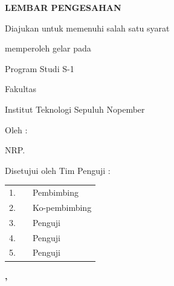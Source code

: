 \begin{center}
  \textbf{LEMBAR PENGESAHAN}\par
  \vspace{\baselineskip}
  \vspace{\baselineskip}
  \textbf{\MakeUppercase{\tatitle{}}}\par
  \vspace{\baselineskip}
  \textbf{\doctypename{}}\par
  Diajukan untuk memenuhi salah satu syarat\par
  memperoleh gelar \degree{} pada\par
  Program Studi S-1 \studyprogram{}\par
  Fakultas \faculty{}\par
  Institut Teknologi Sepuluh Nopember\par
  \vspace{\baselineskip}
  Oleh : \textbf{\MakeUppercase{\name{}}}\par
  NRP. \nrp{}\par
  \vspace{\baselineskip}
  Disetujui oleh Tim Penguji \doctypename{}:
\end{center}

\begingroup
\renewcommand{\arraystretch}{2.2}
\noindent
\begin{tabularx}{\textwidth}{@{}r X p{}@{}}
  1. & \advisor{}    & Pembimbing \\
  2. & \coadvisor{}  & Ko-pembimbing \\
  3. & \examinerone{} & Penguji \\
  4. & \examinertwo{} & Penguji \\
  5. & \examinerthree{} & Penguji
\end{tabularx}
\endgroup

\vspace{\baselineskip}

\begin{center}
  \textbf{\MakeUppercase{\place{}}}\par
  \textbf{\MONTH{}, \the\year{}}
\end{center}
